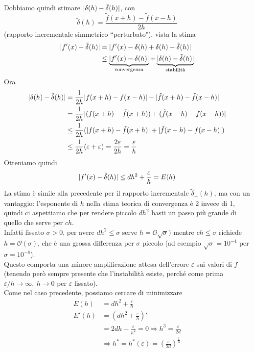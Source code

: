 Dobbiamo quindi stimare $\lvert\delta(h) - \tilde{\delta}(h)\rvert$, con
\[
\tilde{\delta}(h) = \frac{\tilde{f}(x+h) - \tilde{f}(x-h)}{2h}
\]
(rapporto incrementale simmetrico ``perturbato"), vista la stima
\[
\begin{split}
    \lvert f'(x) - \tilde{\delta}(h)\rvert & = \lvert f'(x) - \delta(h) + \delta(h) - \tilde{\delta}(h)\rvert \\
    & \le \underbrace{\lvert f'(x) - \delta(h)\rvert}_{\text{convergenza}} + \underbrace{\lvert\delta(h) - \tilde{\delta}(h)\rvert}_{\text{stabilità}}
\end{split}
\]
Ora
\[
\begin{split}
    \lvert\delta(h) - \tilde{\delta}(h)\rvert & = \frac{1}{2h} \lvert f(x+h) - f(x-h)\rvert - \lvert\tilde{f}(x+h) - \tilde{f}(x-h)\rvert \\
    & = \frac{1}{2h} \lvert(f(x+h) - \tilde{f}(x+h)) + (\tilde{f}(x-h) - f(x-h))\rvert \\
    & \le \frac{1}{2h} (\lvert f(x+h) - \tilde{f}(x+h)\rvert + \lvert\tilde{f}(x-h) - f(x-h)\rvert) \\
    & \le \frac{1}{2h} (\varepsilon + \varepsilon) = \frac{2 \varepsilon}{2h} = \frac{\varepsilon}{h}
\end{split}
\]
Otteniamo quindi
\[
\lvert f'(x) - \tilde{\delta}(h)\rvert \le dh^2 + \frac{\varepsilon}{h} = E(h)
\]
La stima è simile alla precedente per il rapporto incrementale $\tilde{\delta}_+ (h)$, ma con un vantaggio: l'esponente di $h$ nella stima teorica di convergenza è 2
invece di 1, quindi ci aspettiamo che per rendere piccolo $dh^2$ basti un passo più grande di quello che serve per $ch$.\\
Infatti fissato $\sigma > 0$, per avere $dh^2 \le \sigma$ serve $h = \mathcal{O}\sqrt{\sigma})$ mentre $ch \le \sigma$ richiede $h = \mathcal{O}(\sigma)$, che è una grossa differenza per $\sigma$ piccolo (ad esempio $\sqrt{\sigma} = 10^{-4}$ per $\sigma = 10^{-8}$).\\
Questo comporta una minore amplificazione attesa dell'errore $\varepsilon$ sui valori di $f$ (tenendo
però sempre presente che l'instabilità esiste, perché come prima $\varepsilon/h \to \infty, \ h \to 0$ per $\varepsilon$ fissato).\\
Come nel caso precedente, possiamo cercare di minimizzare
\[
\begin{split}
E(h) & = dh^2 + \frac{\varepsilon}{h} \\
E'(h) & = (dh^2 + \frac{\varepsilon}{h})' \\
& = 2dh - \frac{\varepsilon}{h^2} = 0 \Rightarrow h^3 = \frac{\varepsilon}{2d} \\
& \Rightarrow h^* = h^* (\varepsilon) = (\frac{\varepsilon}{2d})^{\frac{1}{3}}
\end{split}
\]

